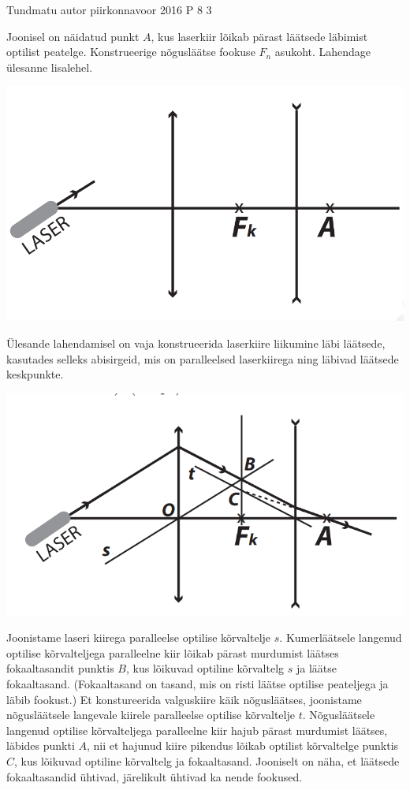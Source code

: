 {Tundmatu autor} %
{piirkonnavoor} %
{2016} %
{P 8} %
{3} %
{
\ifStatement
Joonisel on näidatud punkt $A$, kus laserkiir lõikab pärast läätsede läbimist optilist peatelge. Konstrueerige nõgusläätse fookuse $F_n$ asukoht. Lahendage ülesanne lisalehel.
\begin{center}
	\includegraphics[width=0.5\linewidth]{2016-v2p-08-yl.PNG}
\end{center}
\fi


\ifHint
Ülesande lahendamisel on vaja konstrueerida laserkiire liikumine läbi läätsede, kasutades selleks abisirgeid, mis on paralleelsed laserkiirega ning läbivad läätsede keskpunkte.
\fi


\ifSolution
\begin{center}
	\includegraphics[width=0.5\linewidth]{2016-v2p-08-lah.PNG}
\end{center}
Joonistame laseri kiirega paralleelse optilise kõrvaltelje $s$. Kumerläätsele langenud optilise kõrvalteljega paralleelne kiir lõikab pärast murdumist läätses fokaaltasandit punktis $B$, kus lõikuvad optiline kõrvaltelg $s$ ja läätse fokaaltasand. (Fokaaltasand on tasand, mis on risti läätse optilise peateljega ja läbib fookust.) Et konstureerida valguskiire käik nõgusläätses, joonistame nõgusläätsele langevale kiirele paralleelse optilise kõrvaltelje $t$. Nõgusläätsele langenud optilise kõrvalteljega paralleelne kiir hajub pärast murdumist läätses, läbides punkti $A$, nii et hajunud kiire pikendus lõikab optilist kõrvaltelge punktis $C$, kus lõikuvad optiline kõrvaltelg ja fokaaltasand. Jooniselt on näha, et läätsede fokaaltasandid ühtivad, järelikult ühtivad ka nende fookused.
\fi
}
